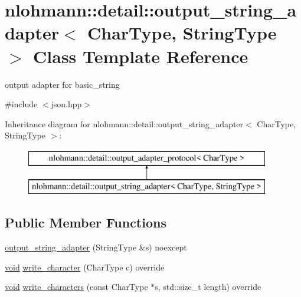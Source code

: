 \hypertarget{classnlohmann_1_1detail_1_1output__string__adapter}{}\section{nlohmann\+::detail\+::output\+\_\+string\+\_\+adapter$<$ Char\+Type, String\+Type $>$ Class Template Reference}
\label{classnlohmann_1_1detail_1_1output__string__adapter}


output adapter for basic\+\_\+string  




{\ttfamily \#include $<$json.\+hpp$>$}

Inheritance diagram for nlohmann\+::detail\+::output\+\_\+string\+\_\+adapter$<$ Char\+Type, String\+Type $>$\+:\begin{figure}[H]
\begin{center}
\leavevmode
\includegraphics[height=2.000000cm]{d2/d39/classnlohmann_1_1detail_1_1output__string__adapter}
\end{center}
\end{figure}
\subsection*{Public Member Functions}
\begin{DoxyCompactItemize}
\item 
\mbox{\hyperlink{classnlohmann_1_1detail_1_1output__string__adapter_af3a49ecd0d23fe56ac21e13d8752abc7}{output\+\_\+string\+\_\+adapter}} (String\+Type \&s) noexcept
\item 
\mbox{\hyperlink{namespacenlohmann_1_1detail_a59fca69799f6b9e366710cb9043aa77d}{void}} \mbox{\hyperlink{classnlohmann_1_1detail_1_1output__string__adapter_a2d76cc6c88ddbc196a63fcfcac9ee7d1}{write\+\_\+character}} (Char\+Type c) override
\item 
\mbox{\hyperlink{namespacenlohmann_1_1detail_a59fca69799f6b9e366710cb9043aa77d}{void}} \mbox{\hyperlink{classnlohmann_1_1detail_1_1output__string__adapter_ab5ea4da075305d225dfd84ad997e8747}{write\+\_\+characters}} (const Char\+Type $\ast$s, std\+::size\+\_\+t length) override
\end{DoxyCompactItemize}
